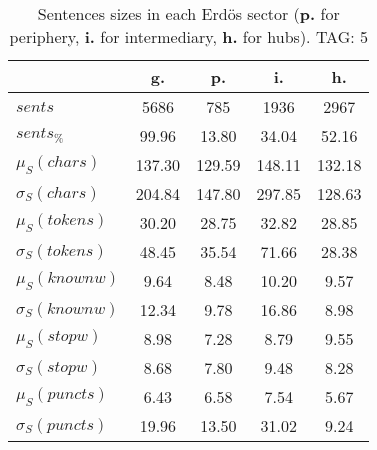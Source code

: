 \begin{table}[h!]
\begin{center}
\begin{tabular}{| l || c | c | c | c |}\hline
 & {\bf g.} & {\bf p.} & {\bf i.} & {\bf h.} \\\hline\hline
$sents$ & 5686  & 785  & 1936  & 2967 \\
$sents_{\%}$ & 99.96  & 13.80  & 34.04  & 52.16 \\\hline
$\mu_S(chars)$ & 137.30  & 129.59  & 148.11  & 132.18 \\
$\sigma_S(chars)$ & 204.84  & 147.80  & 297.85  & 128.63 \\\hline
$\mu_S(tokens)$ & 30.20  & 28.75  & 32.82  & 28.85 \\
$\sigma_S(tokens)$ & 48.45  & 35.54  & 71.66  & 28.38 \\\hline
$\mu_S(knownw)$ & 9.64  & 8.48  & 10.20  & 9.57 \\
$\sigma_S(knownw)$ & 12.34  & 9.78  & 16.86  & 8.98 \\\hline
$\mu_S(stopw)$ & 8.98  & 7.28  & 8.79  & 9.55 \\
$\sigma_S(stopw)$ & 8.68  & 7.80  & 9.48  & 8.28 \\\hline
$\mu_S(puncts)$ & 6.43  & 6.58  & 7.54  & 5.67 \\
$\sigma_S(puncts)$ & 19.96  & 13.50  & 31.02  & 9.24 \\\hline
\end{tabular}
\caption{Sentences sizes in each Erd\"os sector ({{\bf p.}} for periphery, {{\bf i.}} for intermediary, {{\bf h.}} for hubs). TAG: 5}
\end{center}
\end{table}
